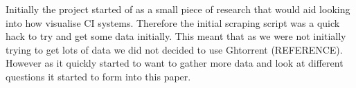 \documentclass[twoside,12pt,titlepage,a4paper]{article}
\begin{document}
  








Initially the project started of as a small piece of research that would aid looking into how visualise CI systems. Therefore the initial scraping script was a quick hack to try and get some data initially. This meant that as we were not initially trying to get lots of data we did not decided to use Ghtorrent (REFERENCE). However as it quickly started to want to gather more data and look at different questions it started to form into this paper. 
\end{document}
